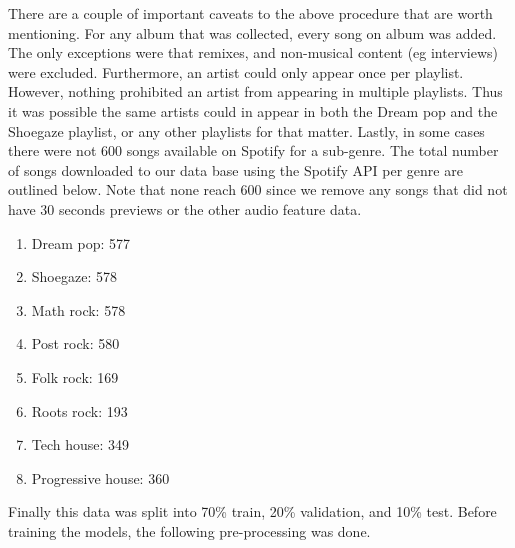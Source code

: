 \documentclass[letterpaper, 12 pt, conference]{ieeeconf}  %
\begin{document}
There are a couple of important caveats to the above procedure that are worth mentioning. For any album that was collected, every song on album was added. The only exceptions were that remixes, and non-musical content (eg interviews) were excluded. Furthermore, an artist could only appear once per playlist. However, nothing prohibited an artist from appearing in multiple playlists. Thus it was possible the same artists could in appear in both the Dream pop and the Shoegaze playlist, or any other playlists for that matter. Lastly, in some cases there were not 600 songs available on Spotify for a sub-genre. The total number of songs downloaded to our data base using the Spotify API per genre are outlined below. Note that none reach 600 since we remove any songs that did not have 30 seconds previews or the other audio feature data.

\begin{enumerate}
    \item Dream pop: 577
    \item Shoegaze: 578
    \item Math rock:   578
    \item Post rock: 580
    \item Folk rock: 169       
    \item  Roots rock: 193
    \item Tech house: 349
    \item Progressive house: 360
\end{enumerate}

Finally this data was split into 70\% train, 20\% validation, and 10\% test. Before training the models, the following pre-processing was done.


 


\end{document}
